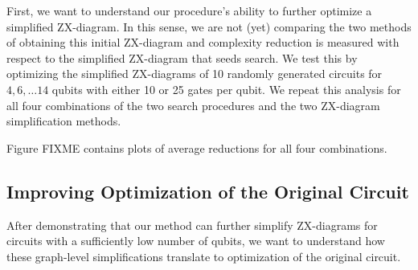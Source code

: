 First, we want to understand our procedure's ability to further optimize a simplified ZX-diagram.
In this sense, we are not (yet) comparing the two methods of obtaining this initial ZX-diagram and complexity reduction is measured with respect to the simplified ZX-diagram that seeds search.
We test this by optimizing the simplified ZX-diagrams of 10 randomly generated circuits for $4, 6, \dots 14$ qubits with either 10 or 25 gates per qubit.
We repeat this analysis for all four combinations of the two search procedures and the two ZX-diagram simplification methods.

Figure FIXME contains plots of average reductions for all four combinations.


\subsection*{Improving Optimization of the Original Circuit}

After demonstrating that our method can further simplify ZX-diagrams for circuits with a sufficiently low number of qubits, we want to understand how these graph-level simplifications translate to optimization of the original circuit.

